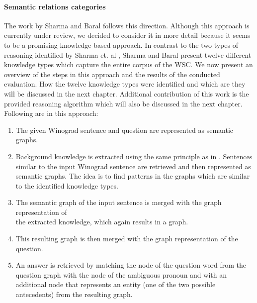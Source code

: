 \paragraph{Semantic relations categories}
The work by Sharma and Baral \cite{2018CommonsenseKT} follows this direction. Although this approach is currently under review, we decided to consider it in more detail because it seems to be a promising knowledge-based approach. In contrast to the two types of reasoning identified by Sharma et. al \cite{DBLP:conf/ijcai/SharmaVAB15}, Sharma and Baral \cite{2018CommonsenseKT} present twelve different knowledge types which capture the entire corpus of the WSC. We now present an overview of the steps in this approach and the results of the conducted evaluation. How the twelve knowledge types were identified and which are they will be discussed in the next chapter. Additional contribution of this work is the provided reasoning algorithm which will also be discussed in the next chapter. 
 \\ Following are  in this approach: 
\begin{enumerate}
	\item The given Winograd sentence and question are represented as semantic graphs.
	\item Background knowledge is extracted using the same principle as in \cite{DBLP:conf/ijcai/SharmaVAB15}. Sentences similar to the input Winograd sentence are retrieved and then represented as semantic graphs. The idea is to find patterns in the graphs which are similar to the identified knowledge types. 
	\item The semantic graph of the input sentence is merged with the graph representation of \\
	 the extracted knowledge, which again results in a graph.
	\item This resulting graph is then merged with the graph representation of the question.
	\item An answer is retrieved by matching the node of the question word from the question graph with the node of the ambiguous pronoun and with an additional node that represents an entity (one of the two possible antecedents) from the resulting graph. 
\end{enumerate}

